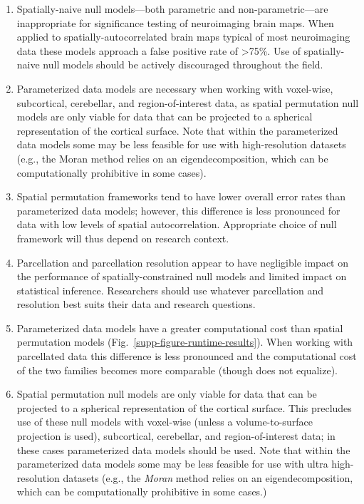 \documentclass[12pt,aps,pra,reprint,showkeys]{revtex4-1}
\begin{document}
\begin{enumerate}[before=\color{blue}]
    \item Spatially-naive null models---both parametric and non-parametric---are inappropriate for significance testing of neuroimaging brain maps.
    When applied to spatially-autocorrelated brain maps typical of most neuroimaging data these models approach a false positive rate of >75\%.
    Use of spatially-naive null models should be actively discouraged throughout the field.
    \item Parameterized data models are necessary when working with voxel-wise, subcortical, cerebellar, and region-of-interest data, as spatial permutation null models are only viable for data that can be projected to a spherical representation of the cortical surface.
    Note that within the parameterized data models some may be less feasible for use with high-resolution datasets (e.g., the Moran method relies on an eigendecomposition, which can be computationally prohibitive in some cases).
    \item Spatial permutation frameworks tend to have lower overall error rates than parameterized data models; however, this difference is less pronounced for data with low levels of spatial autocorrelation.
    Appropriate choice of null framework will thus depend on research context.
    \item Parcellation and parcellation resolution appear to have negligible impact on the performance of spatially-constrained null models and limited impact on statistical inference.
    Researchers should use whatever parcellation and resolution best suits their data and research questions.
    \item Parameterized data models have a greater computational cost than spatial permutation models (Fig.~\ref{supp-figure-runtime-results}).
    When working with parcellated data this difference is less pronounced and the computational cost of the two families becomes more comparable (though does not equalize).
    \item Spatial permutation null models are only viable for data that can be projected to a spherical representation of the cortical surface.
    This precludes use of these null models with voxel-wise (unless a volume-to-surface projection is used), subcortical, cerebellar, and region-of-interest data; in these cases parameterized data models should be used.
    Note that within the parameterized data models some may be less feasible for use with ultra high-resolution datasets (e.g., the \textit{Moran} method relies on an eigendecomposition, which can be computationally prohibitive in some cases.)

\end{enumerate}
\end{document}

